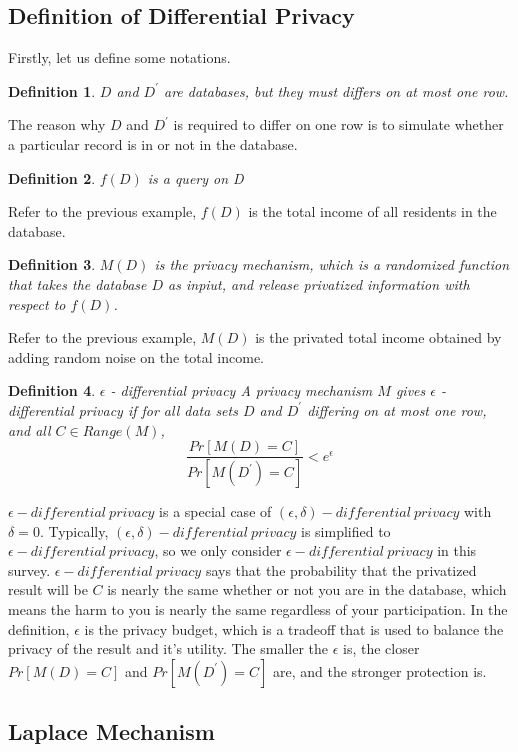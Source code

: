 \documentclass[a4paper, 11pt]{article} %
\newtheorem{definition}{Definition}[section]
\begin{document}
\subsection{Definition of Differential Privacy}
Firstly, let us define some notations.
\theoremstyle{definition}
\begin{definition}{}
 $D$ and $D^\prime$ are databases, but they must differs on at most one row. 
\end{definition}
The reason why $D$ and $D^\prime$ is required to differ on one row is to simulate whether a particular record is in or not in the database.
\begin{definition}{}
$f(D)$ is a query on D
\end{definition}
Refer to the previous example, $f(D)$ is the total income of all residents in the database.
\begin{definition}{}
	$M(D)$ is the privacy mechanism, which is a randomized function that takes the database $D$ as inpiut, and release privatized information with respect to $f(D)$.
\end{definition}
Refer to the previous example, $M(D)$ is the privated total income obtained by adding random noise on the total income.
\begin{definition}{$\epsilon$ - differential privacy}
	A privacy mechanism $M$ gives $\epsilon$ - differential privacy if for all data sets $D$ and $D^\prime$ differing on at most one row, and all $C\in Range(M)$,
	\[  \frac{Pr[M(D) = C]}{Pr[M(D^\prime) = C]}< e^\epsilon \]
\end{definition}
$\epsilon - differential \ privacy$ is a special case of $(\epsilon,\delta) - differential \ privacy$\cite{dwork2011differential,dwork2006our} with $\delta = 0$. Typically, $(\epsilon,\delta) - differential \ privacy$ is simplified to $\epsilon - differential \ privacy$, so we only consider $\epsilon - differential \ privacy$ in this survey. $\epsilon - differential \ privacy$ says that the probability that the privatized result will be $C$ is nearly the same whether or not you are in the database, which means the harm to you is nearly the same regardless of your participation. In the definition, $\epsilon$ is the privacy budget, which is a tradeoff that is used to balance the privacy of the result and it's utility. The smaller the $\epsilon$ is, the closer $Pr[M(D) = C]$ and $Pr[M(D^\prime) = C]$ are, and the stronger protection is. 
\subsection{Laplace Mechanism}
\end{document}
